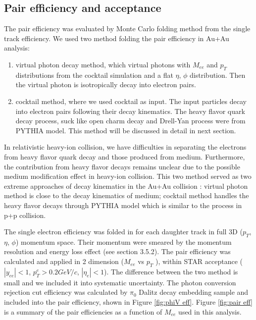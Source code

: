 \subsection{Pair efficiency and acceptance }

The pair efficiency was evaluated by Monte Carlo folding method from
the single track efficiency. We used two method folding the pair efficiency
in Au+Au analysis: 
\begin{enumerate}
\item virtual photon decay method, which virtual photons with $M_{ee}$
and $p_{T}$ distributions from the cocktail simulation and a flat
$\eta$, $\phi$ distribution. Then the virtual photon is isotropically
decay into electron pairs.
\item cocktail method, where we used cocktail as input. The input particles
decay into electron pairs following their decay kinematics. The heavy
flavor quark decay process, suck like open charm decay and Drell-Yan
process were from PYTHIA model. This method will be discussed in detail
in next section.
\end{enumerate}
In relativistic heavy-ion collision, we have difficulties in separating
the electrons from heavy flavor quark decay and those produced from
medium. Furthermore, the contribution from heavy flavor decays remains
unclear due to the possible medium modification effect in heavy-ion
collision. This two method served as two extreme approaches of decay
kinematics in the Au+Au collision : virtual photon method is close
to the decay kinematics of medium; cocktail method handles the heavy
flavor decays through PYTHIA model which is similar to the process
in p+p collision. 

The single electron efficiency was folded in for each daughter track
in full 3D ($p_{T}$, $\eta$, $\phi$) momentum space. Their momentum
were smeared by the momentum resolution and energy loss effect (see
section 3.5.2). The pair efficiency was calculated and applied in
2 dimension ($M_{ee}$ vs $p_{T}$ ), within STAR acceptance ($|y_{ee}|<1$,
$p_{T}^{e}>0.2GeV/c$, $|\eta_{e}|<1$). The difference between the
two method is small and we included it into systematic uncertainty.
The photon conversion rejection cut efficiency was calculated by $\pi_{0}$
Dalitz decay embedding sample and included into the pair efficiency,
shown in Figure \ref{fig:phiV eff}. Figure \ref{fig:pair eff} is
a summary of the pair efficiencies as a function of $M_{ee}$ used
in this analysis.

